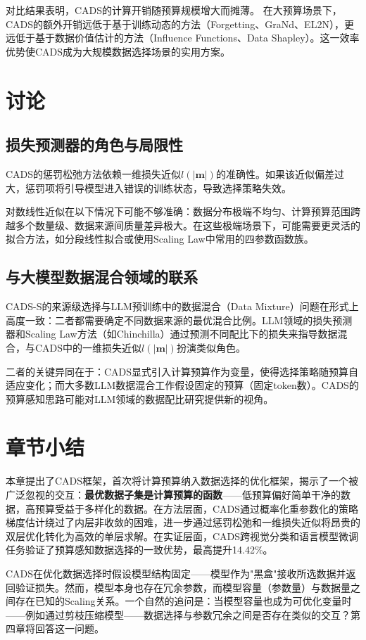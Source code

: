 对比结果表明，CADS的计算开销随预算规模增大而摊薄。%
在大预算场景下，CADS的额外开销远低于基于训练动态的方法（Forgetting、GraNd、EL2N\cite{toneva2018empirical, paul2021deep}），更远低于基于数据价值估计的方法（Influence Functions\cite{pruthi2020estimating}、Data Shapley）。这一效率优势使CADS成为大规模数据选择场景的实用方案。


\section{讨论}

\subsection{损失预测器的角色与局限性}

CADS的惩罚松弛方法依赖一维损失近似$l(|\mathbf{m}|)$的准确性。如果该近似偏差过大，惩罚项将引导模型进入错误的训练状态，导致选择策略失效。

对数线性近似在以下情况下可能不够准确：数据分布极端不均匀、计算预算范围跨越多个数量级、数据来源间质量差异极大。在这些极端场景下，可能需要更灵活的拟合方法，如分段线性拟合或使用Scaling Law中常用的四参数函数族\cite{kaplan2020scaling, hoffmann2022training}。

\subsection{与大模型数据混合领域的联系}

CADS-S的来源级选择与LLM预训练中的数据混合（Data Mixture）问题在形式上高度一致：二者都需要确定不同数据来源的最优混合比例\cite{albalak2024survey}。LLM领域的损失预测器和Scaling Law方法（如Chinchilla\cite{hoffmann2022training}）通过预测不同配比下的损失来指导数据混合，与CADS中的一维损失近似$l(|\mathbf{m}|)$扮演类似角色。

二者的关键异同在于：CADS显式引入计算预算作为变量，使得选择策略随预算自适应变化；而大多数LLM数据混合工作假设固定的预算（固定token数）。CADS的预算感知思路可能对LLM领域的数据配比研究提供新的视角。


\section{章节小结}

本章提出了CADS框架，首次将计算预算纳入数据选择的优化框架，揭示了一个被广泛忽视的交互：\textbf{最优数据子集是计算预算的函数}——低预算偏好简单干净的数据，高预算受益于多样化的数据。在方法层面，CADS通过概率化重参数化的策略梯度估计绕过了内层非收敛的困难，进一步通过惩罚松弛和一维损失近似将昂贵的双层优化转化为高效的单层求解。在实证层面，CADS跨视觉分类和语言模型微调任务验证了预算感知数据选择的一致优势，最高提升14.42\%。%

CADS在优化数据选择时假设模型结构固定——模型作为"黑盒"接收所选数据并返回验证损失。然而，模型本身也存在冗余参数\cite{han2015learning, frankle2018lottery}，而模型容量（参数量）与数据量之间存在已知的Scaling关系\cite{kaplan2020scaling, hoffmann2022training}。一个自然的追问是：当模型容量也成为可优化变量时——例如通过剪枝压缩模型——数据选择与参数冗余之间是否存在类似的交互？第四章将回答这一问题。

